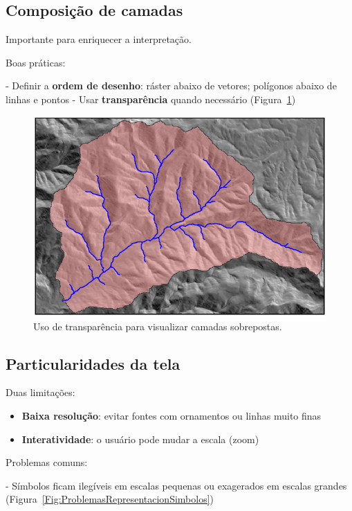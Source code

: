 \subsection{Composição de camadas}

Importante para enriquecer a interpretação.

Boas práticas:

- Definir a \textbf{ordem de desenho}: ráster abaixo de vetores; polígonos abaixo de linhas e pontos
- Usar \textbf{transparência} quando necessário (Figura~\ref{Fig:CombinacionCapas})

\begin{figure}[!hbt]
\centering
\includegraphics[width=.7\columnwidth]{Visualizacao/CombinacionCapas.png}
\caption{\small Uso de transparência para visualizar camadas sobrepostas.}
\label{Fig:CombinacionCapas} 
\end{figure}

\subsection{Particularidades da tela}

Duas limitações:

\begin{itemize}
 \item \textbf{Baixa resolução}: evitar fontes com ornamentos ou linhas muito finas
 \item \textbf{Interatividade}: o usuário pode mudar a escala (zoom)
\end{itemize}

Problemas comuns:

- Símbolos ficam ilegíveis em escalas pequenas ou exagerados em escalas grandes (Figura~\ref{Fig:ProblemasRepresentacionSimbolos})

